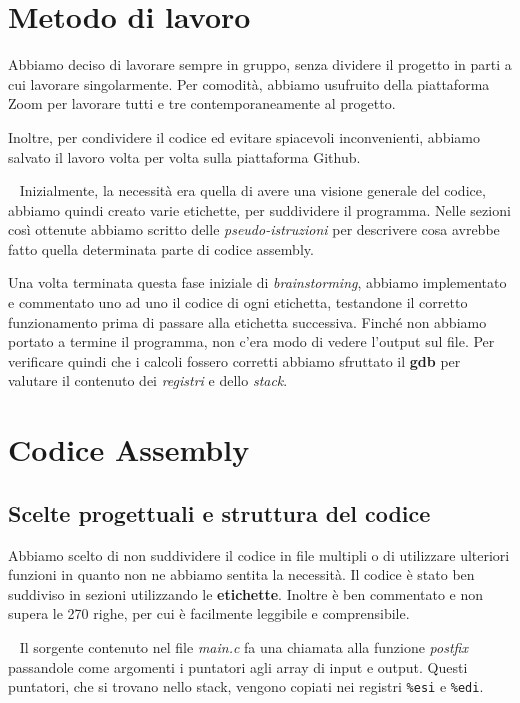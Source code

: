 \documentclass[a4paper,11pt,oneside]{book}
\begin{document}
\chapter{Metodo di lavoro}

Abbiamo deciso di lavorare sempre in gruppo, senza dividere il progetto in parti a cui lavorare singolarmente.
Per comodità, abbiamo usufruito della piattaforma Zoom per lavorare tutti e tre contemporaneamente al progetto.

Inoltre, per condividere il codice ed evitare spiacevoli inconvenienti, abbiamo salvato il lavoro volta per volta sulla piattaforma Github.

~\newline
Inizialmente, la necessità era quella di avere una visione generale del codice, abbiamo quindi creato varie etichette, per suddividere il programma.
Nelle sezioni così ottenute abbiamo scritto delle \emph{pseudo-istruzioni} per descrivere cosa avrebbe fatto quella determinata parte di codice assembly.

Una volta terminata questa fase iniziale di \emph{brainstorming}, abbiamo implementato e commentato uno ad uno il codice di ogni etichetta, testandone il corretto funzionamento 
prima di passare alla etichetta successiva.
Finché non abbiamo portato a termine il programma, non c'era modo di vedere l'output sul file. Per verificare quindi che i calcoli fossero corretti abbiamo sfruttato il \textbf{gdb}
per valutare il contenuto dei \emph{registri} e dello \emph{stack}.

\chapter{Codice Assembly}

\section{Scelte progettuali e struttura del codice}
Abbiamo scelto di non suddividere il codice in file multipli o di utilizzare ulteriori funzioni in quanto non ne abbiamo sentita la necessità. Il codice
è stato ben suddiviso in sezioni utilizzando le \textbf{etichette}. Inoltre è ben commentato e non supera le 270 righe, per cui è facilmente leggibile e comprensibile. 

~\newline
Il sorgente contenuto nel file \emph{main.c} fa una chiamata alla funzione \emph{postfix} passandole come argomenti i puntatori agli array di input e output.
Questi puntatori, che si trovano nello stack, vengono copiati nei registri \verb|%esi| e \verb|%edi|.
\end{document}
